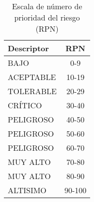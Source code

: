 \begin{table}[htbp]
	\caption{Escala de número de prioridad del riesgo (RPN)}
	\label{tab:rpn}
	\centering
	\begin{tabular}{lc}
		\hline
		\textbf{Descriptor} & \textbf{RPN} \\
		\hline
		BAJO & \cellcolor{GreenColor}0-9 \\
		ACEPTABLE & \cellcolor{GreenColor!50}10-19 \\
		TOLERABLE & \cellcolor{GreenColor!30}20-29 \\
		\hline
		CRÍTICO & \cellcolor{LightRed}30-40 \\
		PELIGROSO & \cellcolor{RedColor!50}40-50 \\
		PELIGROSO  & \cellcolor{RedColor!60}50-60 \\	
		PELIGROSO  & \cellcolor{RedColor!70}60-70 \\
		MUY ALTO & \cellcolor{RedColor!80}70-80 \\
		MUY ALTO & \cellcolor{RedColor!90}80-90 \\
		ALTISIMO & \cellcolor{RedColor}90-100 \\
		\hline
	\end{tabular}
\end{table}

